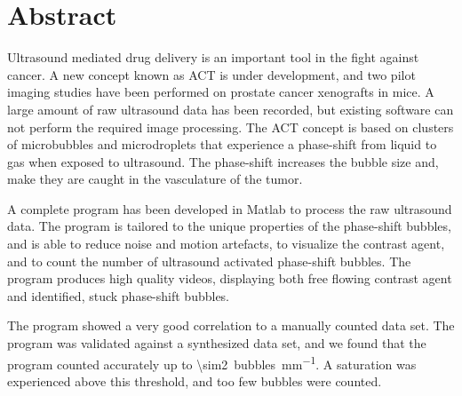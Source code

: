 \section{Abstract}
Ultrasound mediated drug delivery is an important tool in the fight against cancer. A new concept known  as ACT\texttrademark{} is under development, and two pilot imaging studies have been performed on prostate cancer xenografts in mice.  A large amount of raw ultrasound data has been recorded, but existing software can not perform the required image processing. The ACT\texttrademark{} concept is based on clusters of microbubbles and microdroplets that experience a phase-shift from liquid to gas when exposed to ultrasound. The phase-shift increases the bubble size and, make they are caught in the vasculature of the tumor. 

A complete program has been developed in Matlab\textsuperscript{\textregistered} to process the raw ultrasound data. The program is tailored to the unique properties of the phase-shift bubbles, and is able to reduce noise and motion artefacts, to visualize the contrast agent, and to count the number of ultrasound activated phase-shift bubbles. The program produces high quality videos, displaying both free flowing contrast agent and identified, stuck phase-shift bubbles. 

The program showed a very good correlation to a manually counted data set. The program was validated against a synthesized data set, and we found that the program counted accurately up to \SI{\sim2}{bubbles\per\milli\meter}. A saturation was experienced above this threshold, and too few bubbles were counted.  

